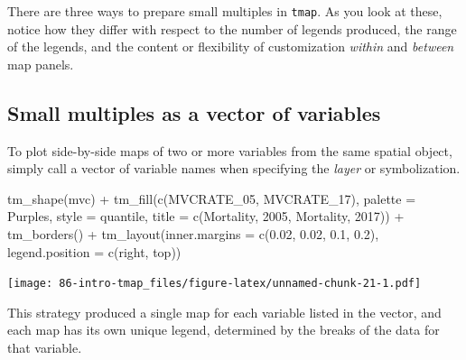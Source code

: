\documentclass[
]{book}
\newenvironment{Shaded}{\begin{snugshade}}{\end{snugshade}}
\newcommand{\AttributeTok}[1]{\textcolor[rgb]{0.77,0.63,0.00}{#1}}
\newcommand{\FloatTok}[1]{\textcolor[rgb]{0.00,0.00,0.81}{#1}}
\newcommand{\FunctionTok}[1]{\textcolor[rgb]{0.00,0.00,0.00}{#1}}
\newcommand{\NormalTok}[1]{#1}
\newcommand{\SpecialCharTok}[1]{\textcolor[rgb]{0.00,0.00,0.00}{#1}}
\newcommand{\StringTok}[1]{\textcolor[rgb]{0.31,0.60,0.02}{#1}}
\newenvironment{rmdnote}[1]
  {
  \begin{itemize}
  \renewcommand{\labelitemi}{
    \raisebox{-.7\height}[0pt][0pt]{
      {\setkeys{Gin}{width=3em,keepaspectratio}\texttt{[image: images/\#1]}}
    }
  }
  \setlength{\fboxsep}{1em}
  \begin{note}
  \item
  }
  {
  \end{note}
  \end{itemize}
  }
\begin{document}
There are three ways to prepare small multiples in \texttt{tmap}. As you look at these, notice how they differ with respect to the number of legends produced, the range of the legends, and the content or flexibility of customization \emph{within} and \emph{between} map panels.

\hypertarget{small-multiples-as-a-vector-of-variables}{%
\subsection{Small multiples as a vector of variables}\label{small-multiples-as-a-vector-of-variables}}

To plot side-by-side maps of two or more variables from the same spatial object, simply call a vector of variable names when specifying the \emph{layer} or symbolization.

\begin{Shaded}
\begin{Highlighting}[]
\FunctionTok{tm\_shape}\NormalTok{(mvc) }\SpecialCharTok{+} 
  \FunctionTok{tm\_fill}\NormalTok{(}\FunctionTok{c}\NormalTok{(}\StringTok{\textquotesingle{}MVCRATE\_05\textquotesingle{}}\NormalTok{, }\StringTok{\textquotesingle{}MVCRATE\_17\textquotesingle{}}\NormalTok{),}
          \AttributeTok{palette =} \StringTok{\textquotesingle{}Purples\textquotesingle{}}\NormalTok{,}
          \AttributeTok{style =} \StringTok{\textquotesingle{}quantile\textquotesingle{}}\NormalTok{,}
          \AttributeTok{title =} \FunctionTok{c}\NormalTok{(}\StringTok{\textquotesingle{}Mortality, 2005\textquotesingle{}}\NormalTok{, }\StringTok{\textquotesingle{}Mortality, 2017\textquotesingle{}}\NormalTok{)) }\SpecialCharTok{+}
  \FunctionTok{tm\_borders}\NormalTok{() }\SpecialCharTok{+}
  \FunctionTok{tm\_layout}\NormalTok{(}\AttributeTok{inner.margins =} \FunctionTok{c}\NormalTok{(}\FloatTok{0.02}\NormalTok{, }\FloatTok{0.02}\NormalTok{, }\FloatTok{0.1}\NormalTok{, }\FloatTok{0.2}\NormalTok{),}
            \AttributeTok{legend.position =} \FunctionTok{c}\NormalTok{(}\StringTok{\textquotesingle{}right\textquotesingle{}}\NormalTok{, }\StringTok{\textquotesingle{}top\textquotesingle{}}\NormalTok{))}
\end{Highlighting}
\end{Shaded}

\texttt{[image: 86-intro-tmap\_files/figure-latex/unnamed-chunk-21-1.pdf]}

\begin{rmdnote}{note}
This strategy produced a single map for each variable listed in the vector, and each map has its own unique legend, determined by the breaks of the data for that variable.

\end{rmdnote}
\end{document}
